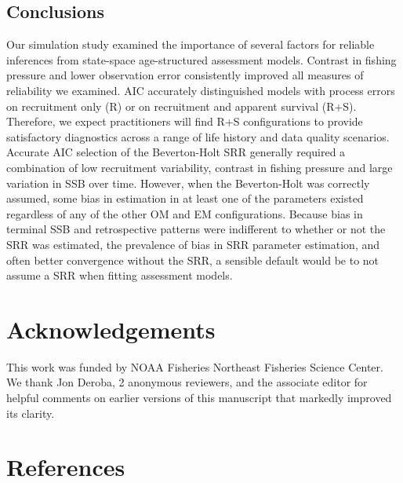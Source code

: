 \documentclass[
  12pt,
]{article}
\begin{document}
\subsection*{Conclusions}\label{conclusions}

Our simulation study examined the importance of several factors for
reliable inferences from state-space age-structured assessment models.
Contrast in fishing pressure and lower observation error consistently
improved all measures of reliability we examined. AIC accurately
distinguished models with process errors on recruitment only (R) or on
recruitment and apparent survival (R+S). Therefore, we expect
practitioners will find R+S configurations to provide satisfactory
diagnostics across a range of life history and data quality scenarios.
Accurate AIC selection of the Beverton-Holt SRR generally required a
combination of low recruitment variability, contrast in fishing pressure
and large variation in SSB over time. However, when the Beverton-Holt
was correctly assumed, some bias in estimation in at least one of the
parameters existed regardless of any of the other OM and EM
configurations. Because bias in terminal SSB and retrospective patterns
were indifferent to whether or not the SRR was estimated, the prevalence
of bias in SRR parameter estimation, and often better convergence
without the SRR, a sensible default would be to not assume a SRR when
fitting assessment models.

\section*{Acknowledgements}\label{acknowledgements}

This work was funded by NOAA Fisheries Northeast Fisheries Science
Center. We thank Jon Deroba, 2 anonymous reviewers, and the associate
editor for helpful comments on earlier versions of this manuscript that
markedly improved its clarity.

\pagebreak

\section*{References}\label{references}
\end{document}
